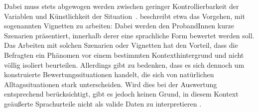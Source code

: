 Dabei muss stets abgewogen werden zwischen geringer Kontrollierbarkeit der Variablen und K{\"u}nstlichkeit der Situation~\citep[s.][4]{Hundt.1992}. 
\citet[1254]{Garrett2005} beschreibt etwa das Vorgehen, mit sogenannten Vignetten zu arbeiten: 
Dabei werden den ProbandInnen kurze Szenarien präsentiert, innerhalb derer eine sprachliche Form bewertet werden soll. 
Das Arbeiten mit solchen Szenarien oder Vignetten hat den Vorteil, dass die Befragten ein Phänomen vor einem bestimmten Kontexthintergrund und nicht völlig isoliert beurteilen. 
Allerdings gibt \citet[1254]{Garrett2005} zu bedenken, dass es sich dennoch um konstruierte Bewertungssituationen handelt, die sich von natürlichen Alltagssituationen stark unterscheiden. 
Wird dies bei der Auswertung entsprechend berücksichtigt, gibt es jedoch keinen Grund, in diesem Kontext geäußerte Sprachurteile nicht als valide Daten zu interpretieren \citep[s.][146]{Soukup.2014}.

